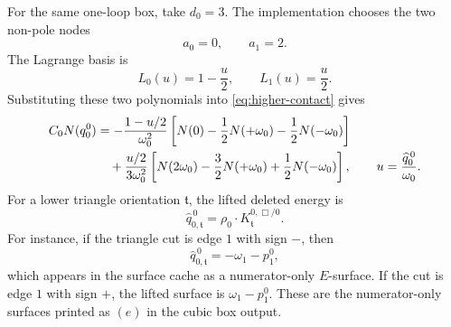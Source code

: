 \documentclass[11pt,a4paper]{report}
\begin{document}
For the same one-loop box, take \(d_0=3\).  The implementation chooses the
two non-pole nodes
\[
  a_0=0,\qquad a_1=2.
\]
The Lagrange basis is
\begin{equation}
  L_0(u)=1-\frac{u}{2},\qquad
  L_1(u)=\frac{u}{2}.
  \label{eq:box-cubic-lagrange}
\end{equation}
Substituting these two polynomials into \eqref{eq:higher-contact} gives
\begin{align}
  C_0N(q_0^0)
  &=
  -\frac{1-u/2}{\omega_0^2}
  \left[
    N(0)-\frac12 N(+\omega_0)-\frac12 N(-\omega_0)
  \right]
  \notag\\
  &\quad
  +\frac{u/2}{3\omega_0^2}
  \left[
    N(2\omega_0)-\frac32 N(+\omega_0)+\frac12 N(-\omega_0)
  \right],
  \qquad u=\frac{\widehat q_0^{\,0}}{\omega_0}.
  \label{eq:box-cubic-contact}
\end{align}
For a lower triangle orientation \(\mathfrak t\), the lifted deleted energy is
\[
  \widehat q_{0,\mathfrak t}^{\,0}
  =
  \rho_0\cdot K_{\mathfrak t}^{0,\Box/0}.
\]
For instance, if the triangle cut is edge \(1\) with sign \(-\), then
\[
  \widehat q_{0,\mathfrak t}^{\,0}=-\omega_1-p_1^0,
\]
which appears in the surface cache as a numerator-only \(E\)-surface.  If the
cut is edge \(1\) with sign \(+\), the lifted surface is
\(\omega_1-p_1^0\).  These are the numerator-only surfaces printed as
\((e)\) in the cubic box output.
\end{document}
